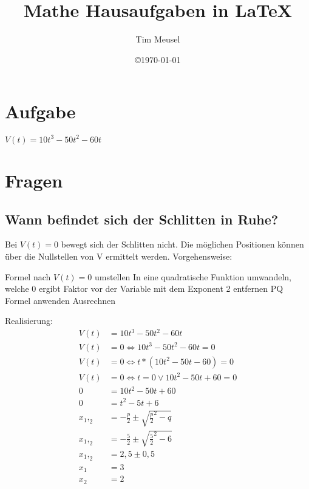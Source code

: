 \documentclass[a4paper,11pt]{scrartcl}
\author{Tim Meusel}
\title{Mathe Hausaufgaben in \LaTeX{}}
\date{\copyright\today}
\begin{document}
\maketitle

\section{Aufgabe}

$V(t) = 10t^3 - 50t^2 - 60t$

\section{Fragen}

\subsection{Wann befindet sich der Schlitten in Ruhe?}
Bei $V(t) = 0$ bewegt sich der Schlitten nicht. Die möglichen Positionen können
über die Nullstellen von V ermittelt werden. Vorgehensweise:

\begin{outline}
  \1 Formel nach $V(t) = 0$ umstellen
  \1 In eine quadratische Funktion umwandeln, welche 0 ergibt
  \1 Faktor vor der Variable mit dem Exponent 2 entfernen
  \1 PQ Formel anwenden
  \1 Ausrechnen
\end{outline}

Realisierung:
\begin{align*}
  V(t) &= 10t^3 - 50t^2 - 60t                               \\
  V(t) &= 0 \Leftrightarrow 10t^3 - 50t^2 - 60t = 0         \\
  V(t) &= 0 \Leftrightarrow t * (10t^2 - 50t - 60) = 0      \\
  V(t) &= 0 \Leftrightarrow t = 0 \vee 10t^2 - 50t + 60 = 0 \\
     0 &= 10t^2 - 50t + 60                                  \\
     0 &= t^2 - 5t + 6                                      \\
 x_1,_2 &= -\frac{p}{2} \pm \sqrt{\frac{p}{2}^2 - q}        \\
 x_1,_2 &= -\frac{5}{2} \pm \sqrt{\frac{5}{2}^2 - 6}        \\
 x_1,_2 &= 2,5 \pm 0,5                                      \\
 x_1    &= 3                                                \\
 x_2    &= 2                                                \\
\end{align*}
\end{document}
